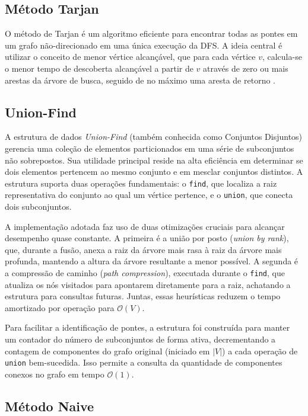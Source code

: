 \documentclass[12pt]{article}
\begin{document}
\subsection{Método Tarjan} \label{tarjan}

O método de Tarjan é um algoritmo eficiente para encontrar todas as pontes em um grafo não-direcionado em uma única execução da DFS. A ideia central é utilizar o conceito de menor vértice alcançável, que para cada vértice $v$, calcula-se o menor tempo de descoberta alcançável a partir de $v$ através de zero ou mais arestas da árvore de busca, seguido de no máximo uma aresta de retorno \cite{Tarjan1974}.

\subsection{Union-Find} \label{union-find}

A estrutura de dados \textit{Union-Find} (também conhecida como Conjuntos Disjuntos) gerencia uma coleção de elementos particionados em uma série de subconjuntos não sobrepostos. Sua utilidade principal reside na alta eficiência em determinar se dois elementos pertencem ao mesmo conjunto e em mesclar conjuntos distintos. A estrutura suporta duas operações fundamentais: o \texttt{find}, que localiza a raiz representativa do conjunto ao qual um vértice pertence, e o \texttt{union}, que conecta dois subconjuntos.

A implementação adotada faz uso de duas otimizações cruciais para alcançar desempenho quase constante. A primeira é a união por posto (\textit{union by rank}), que, durante a fusão, anexa a raiz da árvore mais rasa à raiz da árvore mais profunda, mantendo a altura da árvore resultante a menor possível. A segunda é a compressão de caminho (\textit{path compression}), executada durante o \texttt{find}, que atualiza os nós visitados para apontarem diretamente para a raiz, achatando a estrutura para consultas futuras. Juntas, essas heurísticas reduzem o tempo amortizado por operação para $\mathcal{O}(V)$. 

Para facilitar a identificação de pontes, a estrutura foi construída para manter um contador do número de subconjuntos de forma ativa, decrementando a contagem de componentes do grafo original (iniciado em $|V|$) a cada operação de \texttt{union} bem-sucedida. Isso permite a consulta da quantidade de componentes conexos no grafo em tempo $\mathcal{O}(1)$.

\subsection{Método Naive} \label{naive}
\end{document}
